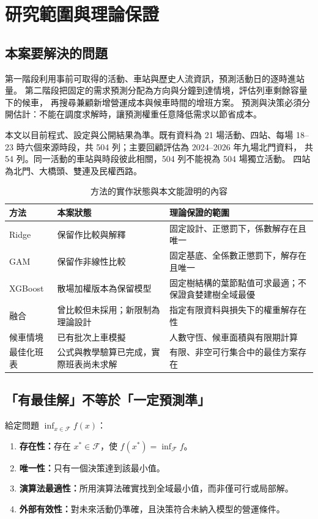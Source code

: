 \section{研究範圍與理論保證}

\subsection{本案要解決的問題}
第一階段利用事前可取得的活動、車站與歷史人流資訊，預測活動日的逐時進站量。
第二階段把固定的需求預測分配為方向與分鐘到達情境，評估列車剩餘容量下的候車，
再搜尋兼顧新增營運成本與候車時間的增班方案。
預測與決策必須分開估計：不能在調度求解時，讓預測權重任意降低需求以節省成本。

本文以目前程式、設定與公開結果為準。既有資料為 21 場活動、四站、每場
18--23 時六個來源時段，共 504 列；主要回顧評估為 2024--2026 年九場北門資料，
共 54 列。同一活動的車站與時段彼此相關，504 列不能視為 504 場獨立活動。
四站為北門、大橋頭、雙連及民權西路。

\begin{table}[htbp]
\centering\small
\caption{方法的實作狀態與本文能證明的內容}
\begin{tabularx}{\linewidth}{@{}p{24mm}p{36mm}X@{}}
\toprule
方法 & 本案狀態 & 理論保證的範圍\\
\midrule
Ridge & 保留作比較與解釋 & 固定設計、正懲罰下，係數解存在且唯一\\
GAM & 保留作非線性比較 & 固定基底、全係數正懲罰下，解存在且唯一\\
XGBoost & 散場加權版本為保留模型 & 固定樹結構的葉節點值可求最適；不保證貪婪建樹全域最優\\
融合 & 曾比較但未採用；新限制為理論設計 & 指定有限資料與損失下的權重解存在性\\
候車情境 & 已有批次上車模擬 & 人數守恆、候車面積與有限期計算\\
最佳化班表 & 公式與教學驗算已完成，實際班表尚未求解 & 有限、非空可行集合中的最佳方案存在\\
\bottomrule
\end{tabularx}
\end{table}

\subsection{「有最佳解」不等於「一定預測準」}
\begin{definition}[四種不同的敘述]
給定問題 $\inf_{x\in\mathcal F}f(x)$：
\begin{enumerate}
\item \textbf{存在性：}存在 $x^*\in\mathcal F$，使 $f(x^*)=\inf_{\mathcal F}f$。
\item \textbf{唯一性：}只有一個決策達到該最小值。
\item \textbf{演算法最適性：}所用演算法確實找到全域最小值，而非僅可行或局部解。
\item \textbf{外部有效性：}對未來活動仍準確，且決策符合未納入模型的營運條件。
\end{enumerate}
\end{definition}

